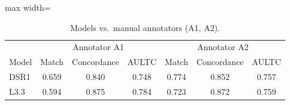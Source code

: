 \begin{table}[htbp]
\caption{Models vs.\ manual annotators (A1, A2).}
\ChSixTableBodyStart
\begin{ChSixFloatBody}

\centering
\small


\begin{adjustbox}{max width=\columnwidth}
\begin{tabular}{lccc|ccc}
\toprule
& \multicolumn{3}{c|}{Annotator A1} & \multicolumn{3}{c}{Annotator A2} \\
Model & Match & Concordance & AULTC & Match & Concordance & AULTC \\
\midrule
DSR1 & 0.659 & 0.840 & 0.748 & 0.774 & 0.852 & 0.757 \\
L3.3  & 0.594 & 0.875 & 0.784 & 0.723 & 0.872 & 0.759 \\
\bottomrule
\end{tabular}
\end{adjustbox}

\end{ChSixFloatBody}
\end{table}